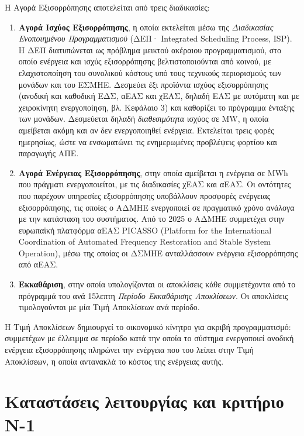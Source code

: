 

Η Αγορά Εξισορρόπησης αποτελείται από τρεις διαδικασίες:

\begin{enumerate}
\item \textbf{Αγορά Ισχύος Εξισορρόπησης}, η οποία εκτελείται μέσω της \emph{Διαδικασίας
      Ενοποιημένου Προγραμματισμού} (ΔΕΠ· Integrated Scheduling Process, ISP). Η ΔΕΠ
      διατυπώνεται ως πρόβλημα μεικτού ακέραιου προγραμματισμού, στο οποίο ενέργεια και ισχύς
      εξισορρόπησης βελτιστοποιούνται από κοινού, με ελαχιστοποίηση του συνολικού κόστους υπό
      τους τεχνικούς περιορισμούς των μονάδων και του ΕΣΜΗΕ. Δεσμεύει έξι προϊόντα ισχύος
      εξισορρόπησης (ανοδική και καθοδική ΕΔΣ, αΕΑΣ και χΕΑΣ, δηλαδή ΕΑΣ με αυτόματη και με
      χειροκίνητη ενεργοποίηση, βλ. Κεφάλαιο 3) και καθορίζει το
      πρόγραμμα ένταξης των μονάδων. Δεσμεύεται δηλαδή \emph{διαθεσιμότητα} ισχύος σε MW, η
      οποία αμείβεται ακόμη και αν δεν ενεργοποιηθεί ενέργεια.
      Εκτελείται τρεις φορές ημερησίως, ώστε να ενσωματώνει τις ενημερωμένες προβλέψεις
      φορτίου και παραγωγής ΑΠΕ.
\item \textbf{Αγορά Ενέργειας Εξισορρόπησης}, στην οποία αμείβεται η ενέργεια σε MWh που
      πράγματι ενεργοποιείται, με τις διαδικασίες χΕΑΣ και αΕΑΣ. Οι οντότητες που παρέχουν υπηρεσίες εξισορρόπησης υποβάλλουν προσφορές ενέργειας εξισορρόπησης, τις
      οποίες ο ΑΔΜΗΕ ενεργοποιεί σε πραγματικό χρόνο ανάλογα με την κατάσταση του συστήματος.
      Από το 2025 ο ΑΔΜΗΕ συμμετέχει στην ευρωπαϊκή πλατφόρμα αΕΑΣ PICASSO (Platform for the
      International Coordination of Automated Frequency Restoration and Stable System
      Operation), μέσω της οποίας οι ΔΣΜΗΕ ανταλλάσσουν ενέργεια εξισορρόπησης από αΕΑΣ.
\item \textbf{Εκκαθάριση}, στην οποία υπολογίζονται οι αποκλίσεις κάθε συμμετέχοντα από το
      πρόγραμμά του ανά 15λεπτη \emph{Περίοδο Εκκαθάρισης Αποκλίσεων}. Οι αποκλίσεις
      τιμολογούνται με μία Τιμή Αποκλίσεων ανά περίοδο.
\end{enumerate}

Η Τιμή Αποκλίσεων δημιουργεί το οικονομικό κίνητρο για ακριβή προγραμματισμό: συμμετέχων με
έλλειμμα σε περίοδο κατά την οποία το σύστημα ενεργοποιεί ανοδική ενέργεια εξισορρόπησης
πληρώνει την ενέργεια που του λείπει στην Τιμή Αποκλίσεων, η οποία αντανακλά το κόστος της
ενέργειας αυτής. 


\section{Καταστάσεις λειτουργίας και κριτήριο N-1}
\label{sec:states}

